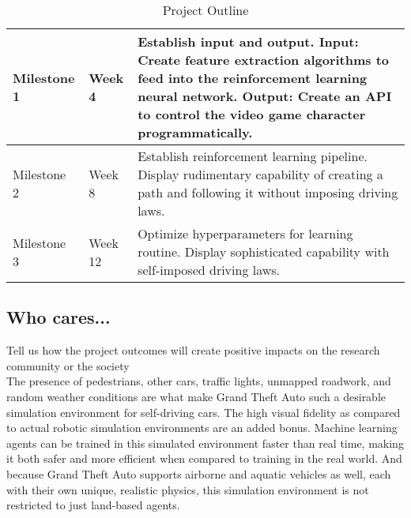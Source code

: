 
%
\begin{table}[!t]
\caption{Project Outline}
\begin{tabular}{|l|l|l|}
\hline
Milestone 1 & Week 4  & \multicolumn{1}{p{5cm}|}{Establish input and output. Input: Create feature extraction algorithms to feed into the reinforcement learning neural network. Output: Create an API to control the video game character programmatically.} \\ \hline
Milestone 2 & Week 8  & \multicolumn{1}{p{5cm}|}{Establish reinforcement learning pipeline. Display rudimentary capability of creating a path and following it without imposing driving laws.}\\ \hline
Milestone 3 & Week 12 & \multicolumn{1}{p{5cm}|}{Optimize hyperparameters for learning routine. Display sophisticated capability with self-imposed driving laws.} \\ \hline
\end{tabular}
\end{table}

\subsection{Who cares...}
Tell us how the project outcomes will create positive impacts on the research community or the society\\
The presence of pedestrians, other cars, traffic lights, unmapped roadwork, and random weather conditions are what make Grand Theft Auto such a desirable simulation environment for self-driving cars. The high visual fidelity as compared to actual robotic simulation environments are an added bonus. Machine learning agents can be trained in this simulated environment faster than real time, making it both safer and more efficient when compared to training in the real world. And because Grand Theft Auto supports airborne and aquatic vehicles as well, each with their own unique, realistic physics, this simulation environment is not restricted to just land-based agents.